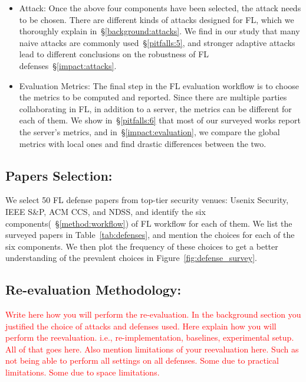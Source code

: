 \begin{itemize}
    \item Attack: Once the above four components have been selected, the attack needs to be chosen. There are different kinds of attacks designed for FL, which we thoroughly explain in~\S\ref{background:attacks}. We find in our study that many naive attacks are commonly used~\S\ref{pitfalls:5}, and stronger adaptive attacks lead to different conclusions on the robustness of FL defenses~\S\ref{impact:attacks}.
    \item Evaluation Metrics: The final step in the FL evaluation workflow is to choose the metrics to be computed and reported. Since there are multiple parties collaborating in FL, in addition to a server, the metrics can be different for each of them. We show in~\S\ref{pitfalls:6} that most of our surveyed works report the server's metrics, and in~\S\ref{impact:evaluation}, we compare the global metrics with local ones and find drastic differences between the two.
\end{itemize}

\subsection{Papers Selection:}\label{method:selection}
We select 50 FL defense papers from top-tier security venues: Usenix Security, IEEE S\&P, ACM CCS, and NDSS, and identify the six components(~\S\ref{method:workflow}) of FL workflow for each of them. We list the surveyed papers in Table~\ref{tab:defenses}, and mention the choices for each of the six components. We then plot the frequency of these choices to get a better understanding of the prevalent choices in Figure~\ref{fig:defense_survey}.

\subsection{Re-evaluation Methodology:}\label{method:reevaluation}
\textcolor{red}{Write here how you will perform the re-evaluation. In the background section you justified the choice of attacks and defenses used. Here explain how you will perform the reevaluation. i.e., re-implementation, baselines, experimental setup. All of that goes here. Also mention limitations of your reevaluation here. Such as not being able to perform all settings on all defenses. Some due to practical limitations. Some due to space limitations.}

